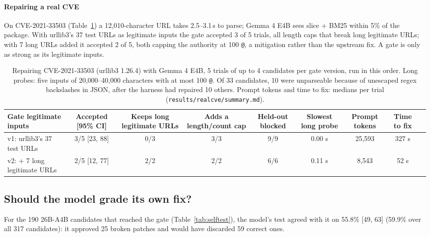 \documentclass[journal]{IEEEtran}
\newcommand{\code}[1]{\texttt{#1}}
\begin{document}
\paragraph{Repairing a real CVE} On CVE-2021-33503 (Table~\ref{tab:cverep}) a 12,010-character URL takes 2.5--3.1\,s to parse; Gemma 4 E4B sees slice + BM25 within 5\% of the package. With urllib3's 37 test URLs as legitimate inputs the gate accepted 3 of 5 trials, all length caps that break long legitimate URLs; with 7 long URLs added it accepted 2 of 5, both capping the authority at 100 \code{@}, a mitigation rather than the upstream fix. A gate is only as strong as its legitimate inputs.

\begin{table}[!t]
\centering\small
\caption{Repairing CVE-2021-33503 (urllib3 1.26.4) with Gemma 4 E4B, 5 trials of up to 4 candidates per gate version, run in this order. Long probes: five inputs of 20,000--40,000 characters with at most 100 \code{@}. Of 33 candidates, 10 were unparseable because of unescaped regex backslashes in JSON, after the harness had repaired 10 others. Prompt tokens and time to fix: medians per trial (\code{results/realcve/summary.md}).}
\label{tab:cverep}
\begin{adjustbox}{max width=\linewidth}\begin{tabular}{lcccccccc}
\toprule
Gate legitimate inputs & Accepted [95\% CI] & Keeps long legitimate URLs & Adds a length/count cap & Held-out blocked & Slowest long probe & Prompt tokens & Time to fix\\
\midrule
v1: urllib3's 37 test URLs & 3/5 [23, 88] & 0/3 & 3/3 & 9/9 & 0.00 s & 25,593 & 327 s\\
v2: + 7 long legitimate URLs & 2/5 [12, 77] & 2/2 & 2/2 & 6/6 & 0.11 s & 8,543 & 52 s\\
\bottomrule
\end{tabular}\end{adjustbox}
\end{table}



\subsection{Should the model grade its own fix?}
For the 190 26B-A4B candidates that reached the gate (Table~\ref{tab:selftest}), the model's test agreed with it on 55.8\% [49, 63] (59.9\% over all 317 candidates): it approved 25 broken patches and would have discarded 59 correct ones.
\end{document}
